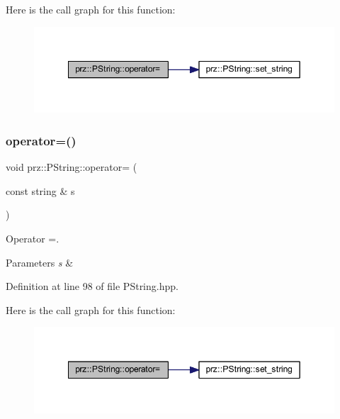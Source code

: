 Here is the call graph for this function\+:
\nopagebreak
\begin{figure}[H]
\begin{center}
\leavevmode
\includegraphics[width=349pt]{classprz_1_1_p_string_af11c712191376d1a520d9f6fec1043f1_cgraph}
\end{center}
\end{figure}
\mbox{\label{classprz_1_1_p_string_a35a75dce51e36e533fcb764b7b526f43}} 
\subsubsection{\texorpdfstring{operator=()}{operator=()}\hspace{0.1cm}{\footnotesize\ttfamily [2/3]}}
{\footnotesize\ttfamily void prz\+::\+P\+String\+::operator= (\begin{DoxyParamCaption}\item[{const string \&}]{s }\end{DoxyParamCaption})\hspace{0.3cm}{\ttfamily [inline]}}



Operator =. 


\begin{DoxyParams}{Parameters}
{\em s} & \\
\hline
\end{DoxyParams}


Definition at line 98 of file P\+String.\+hpp.

Here is the call graph for this function\+:
\nopagebreak
\begin{figure}[H]
\begin{center}
\leavevmode
\includegraphics[width=349pt]{classprz_1_1_p_string_a35a75dce51e36e533fcb764b7b526f43_cgraph}
\end{center}
\end{figure}
\mbox{\label{classprz_1_1_p_string_a01b27436f489b3e768a3c3eaa526d3b5}} 
